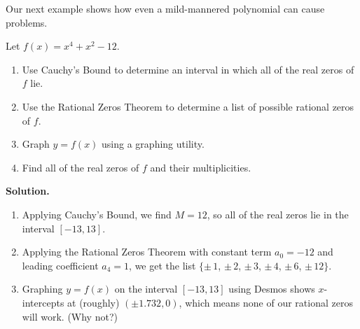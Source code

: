 \documentclass{ximera}
\begin{document}
Our next example shows how even a mild-mannered polynomial can cause problems.

\begin{example}  \label{polyquadinform} Let $f(x) = x^4 + x^2 - 12$.

\begin{enumerate}

\item  Use Cauchy's Bound to determine an interval in which all of the real zeros of $f$ lie.

\item  Use the Rational Zeros Theorem to determine a list of possible rational zeros of $f$.

\item  Graph $y=f(x)$ using a graphing utility.

\item  Find all of the real zeros of $f$ and their multiplicities.


\end{enumerate}

{\bf Solution.}

\begin{enumerate}

\item  Applying Cauchy's Bound, we find $M = 12$, so all of the real zeros lie in the interval $[-13,13]$.

\item  Applying the Rational Zeros Theorem with constant term $a_0 = -12$ and leading coefficient $a_4 = 1$, we get the list $\{\pm \, 1$, $\pm \, 2$, $\pm \, 3$, $\pm \, 4$, $\pm \, 6$, $\pm \, 12\}$.

\item  Graphing $y=f(x)$ on the interval $[-13,13]$ using Desmos shows $x$-intercepts at (roughly) $(\pm 1.732, 0)$, which means none of our rational zeros will work. (Why not?)

\begin{center}
\end{center} 


\end{enumerate}
\end{example}
\end{document}

